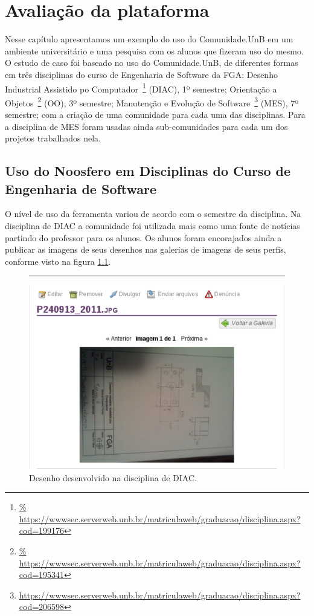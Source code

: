 \chapter{Avaliação da plataforma}

Nesse capítulo apresentamos um exemplo do uso do Comunidade.UnB em um ambiente
universitário e uma pesquisa com os alunos que fizeram uso do mesmo.
%
O estudo de caso foi baseado no uso do Comunidade.UnB, de diferentes formas em
três disciplinas do curso de Engenharia de Software da FGA:
%
Desenho Industrial Assistido po Computador~\footnote{\url{%
https://wwwsec.serverweb.unb.br/matriculaweb/graduacao/disciplina.aspx?cod=199176}} (DIAC), 1º semestre;
%
Orientação a Objetos~\footnote{\url{%
https://wwwsec.serverweb.unb.br/matriculaweb/graduacao/disciplina.aspx?cod=195341}}
(OO), 3º semestre;
%
Manutenção e Evolução de Software~\footnote{\url{
https://wwwsec.serverweb.unb.br/matriculaweb/graduacao/disciplina.aspx?cod=206598}}
(MES), 7º semestre;
%
com a criação de uma comunidade para cada uma das disciplinas. Para a disciplina de
MES foram usadas ainda sub-comunidades para cada um dos projetos trabalhados nela.

\section{Uso do Noosfero em Disciplinas do Curso de Engenharia de Software}
\label{mes-unb}

O nível de uso da ferramenta variou de acordo com o semestre da disciplina. Na
disciplina de DIAC a comunidade foi utilizada mais como uma fonte de notícias
partindo do professor para os alunos. Os alunos foram encorajados ainda a publicar
as imagens de seus desenhos nas galerias de imagens de seus perfis, conforme
visto na figura \ref{imagem-diac}.

\begin{figure}[h!]
    \centering
		\rule{1cm}{1cm}
    \includegraphics[keepaspectratio=true,scale=0.65]
      {figuras/imagem-diac.eps}
    \caption{Desenho desenvolvido na disciplina de DIAC.}
    \label{imagem-diac}
\end{figure}

